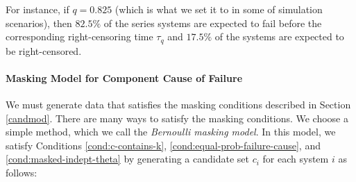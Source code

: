 \documentclass[
]{article}
\theoremstyle{definition}
\theoremstyle{plain}
\theoremstyle{definition}
\theoremstyle{definition}
\theoremstyle{definition}
\theoremstyle{definition}
\theoremstyle{remark}
\begin{document}
For instance, if \(q = 0.825\) (which is what we set it to in some of
simulation scenarios), then \(82.5\%\) of the series systems are expected to fail
before the corresponding right-censoring time \(\tau_q\) and \(17.5\%\) of the systems are expected
to be right-censored.

\hypertarget{masking-model-for-component-cause-of-failure}{%
\paragraph*{Masking Model for Component Cause of Failure}\label{masking-model-for-component-cause-of-failure}}

We must generate data that satisfies the masking conditions described in
Section \ref{candmod}.
There are many ways to satisfy the masking conditions. We choose a simple
method, which we call the \emph{Bernoulli masking model}. In this model, we
satisfy Conditions \ref{cond:c-contains-k}, \ref{cond:equal-prob-failure-cause},
and \ref{cond:masked-indept-theta} by generating a candidate set \(c_i\) for
each system \(i\) as follows:
\end{document}
